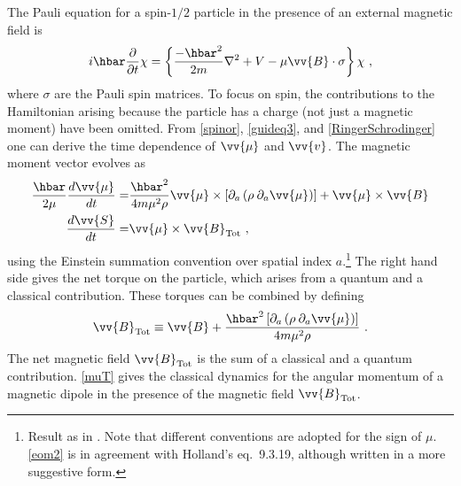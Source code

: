\documentclass[12pt,secnumarabic,balancelastpage,amsmath,amssymb,nofootinbib]{article}
\begin{document}
The Pauli equation for a spin-$1/2$ particle in the presence of an external magnetic field is
\begin{equation}
i\hbar\frac{\partial}{\partial t} \chi = \left\{\frac{-\hbar^2}{2 m}\nabla^2+V-\mu \vv{B} \cdot \sigma\right\}\chi\ ,
\label{RingerSchrodinger}
\end{equation}
where $\sigma$ are the Pauli spin matrices.  To focus on spin, the contributions to the Hamiltonian arising because the particle has a charge (not just a magnetic moment) have been omitted.  From \eqref{spinor}, \eqref{guideq3}, and \eqref{RingerSchrodinger} one can derive the time dependence of $\vv{\mu}$ and $\vv{v}$.  The magnetic moment vector evolves as
\begin{align}
\frac{\hbar}{2 \mu}\frac{d\vv{\mu}}{dt}=&\frac{\hbar^2}{4 m \mu^2 \rho} \vv{\mu} \times \left[ \partial_a \left(\rho \: \partial_a \vv{\mu}\right) \right] + \vv{\mu} \times \vv{B}
\nonumber
\\
\frac{d \vv{S}}{dt}=&\vv{\mu} \times \vv{B}_{\text{Tot}}\ ,
\label{muT}
\end{align}
using the Einstein summation convention over spatial index $a$.\footnote{Result as in \citet[eq.\ 9.3.15]{holland}.  Note that different conventions are adopted for the sign of $\mu$.  \eqref{eom2} is in agreement with Holland's eq.\ 9.3.19, although written in a more suggestive form.}  The right hand side gives the net torque on the particle, which arises from a quantum and a classical contribution.  These torques can be combined by defining
\begin{equation}
\vv{B}_{\text{Tot}}\equiv\vv{B}+\frac{\hbar^2 \left[ \partial_a \left(\rho \: \partial_a \vv{\mu}\right) \right]}{4 m \mu^2 \rho}\ .
\label{bagnetic}
\end{equation}
The net magnetic field $\vv{B}_{\text{Tot}}$ is the sum of a classical and a quantum contribution.  \eqref{muT} gives the classical dynamics for the angular momentum of a magnetic dipole in the presence of the magnetic field $\vv{B}_{\text{Tot}}$.
\end{document}
